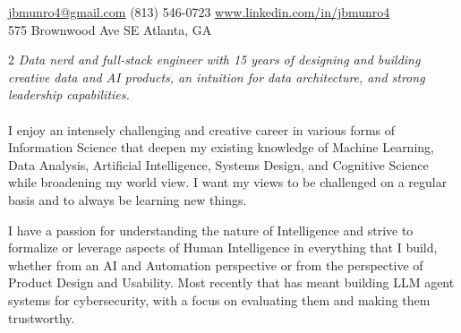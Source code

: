 \documentclass[10pt,a4paper]{article}
\begin{document}
\sloppy  %



\nobreakvspace{0.3em}  %

\noindent\href{mailto:jbmunro4.at.gmail.dot.com}{jbmunro4\mbox{}@\mbox{}gmail.com}\sbull
\textsmaller(813) 546-0723\sbull
\href{http://www.linkedin.com/in/jbmunro4}{www.linkedin.com/in/jbmunro4}
\\
575 Brownwood Ave SE\sbull
Atlanta, GA

\spacedhrule{0.9em}{-0.4em}  %


\vspace{-1.3em}  %
\begin{multicols}{2}  %
\noindent \emph{Data nerd and full-stack engineer with 15 years of designing and building creative data and AI products, an intuition for data architecture, and strong leadership capabilities.}
\\
\\
I enjoy an intensely challenging and creative career in various forms of Information Science that deepen my existing knowledge of Machine Learning, Data Analysis, Artificial Intelligence, Systems Design, and Cognitive Science while broadening my world view. I want my views to be challenged on a regular basis and to always be learning new things.

I have a passion for understanding the nature of \mbox{Intelligence} and strive to formalize or leverage aspects of Human Intelligence in everything that I build, whether from an AI and Automation perspective or from the perspective of Product Design and Usability. Most recently that has meant building LLM agent systems for cybersecurity, with a focus on evaluating them and making them trustworthy.
\end{multicols}


\spacedhrule{0em}{-0.4em}

\end{document}
